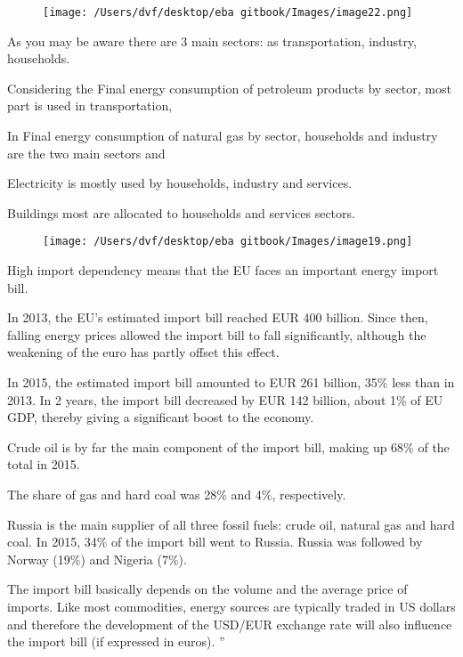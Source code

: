 \documentclass[]{book}
\theoremstyle{definition}
\theoremstyle{definition}
\theoremstyle{definition}
\theoremstyle{remark}
\begin{document}
\begin{figure}[htbp]
\centering
\texttt{[image: /Users/dvf/desktop/eba gitbook/Images/image22.png]}
\caption{}
\end{figure}

As you may be aware there are 3 main sectors: as transportation,
industry, households.

Considering the Final energy consumption of petroleum products by
sector, most part is used in transportation,

In Final energy consumption of natural gas by sector, households and
industry are the two main sectors and

Electricity is mostly used by households, industry and services.

Buildings most are allocated to households and services sectors.

\begin{figure}[htbp]
\centering
\texttt{[image: /Users/dvf/desktop/eba gitbook/Images/image19.png]}
\caption{}
\end{figure}

High import dependency means that the EU faces an important energy
import bill.

In 2013, the EU's estimated import bill reached EUR 400 billion. Since
then, falling energy prices allowed the import bill to fall
significantly, although the weakening of the euro has partly offset this
effect.

In 2015, the estimated import bill amounted to EUR 261 billion, 35\%
less than in 2013. In 2 years, the import bill decreased by EUR 142
billion, about 1\% of EU GDP, thereby giving a significant boost to the
economy.

Crude oil is by far the main component of the import bill, making up
68\% of the total in 2015.

The share of gas and hard coal was 28\% and 4\%, respectively.

Russia is the main supplier of all three fossil fuels: crude oil,
natural gas and hard coal. In 2015, 34\% of the import bill went to
Russia. Russia was followed by Norway (19\%) and Nigeria (7\%).

The import bill basically depends on the volume and the average price of
imports. Like most commodities, energy sources are typically traded in
US dollars and therefore the development of the USD/EUR exchange rate
will also influence the import bill (if expressed in euros). ''
\end{document}
